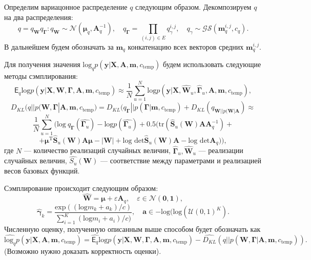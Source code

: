 \documentclass[12pt]{article}
\begin{document}
Определим вариацонное распределение $q$ следующим образом. 
Декомпозируем $q$ на два распределения: 
$$q = q_{\mathbf{W}}q_{\boldsymbol{\Gamma}}:
q_{\mathbf{W}} \sim \mathcal{N}(\boldsymbol{\mu}_q, \mathbf{A}^{-1}_q), \quad q_{\boldsymbol{\Gamma}} = \prod_{(i,j) \in E} q_\gamma^{i,j}, \quad q_\gamma \sim \mathcal{GS}( \mathbf{m}_q^{i,j}, c_q).$$
В дальнейшем будем обозначать за $\mathbf{m}_q$ конкатенацию всех векторов средних  $\mathbf{m}_q^{i,j}$.

Для получения значения $\text{log}_q {p}(\mathbf{y}|\mathbf{X},\mathbf{A},\mathbf{m}, c_{\text{temp}})$ будем использовать следующие методы сэмплирования:
$$
    \mathsf{E}_{q}\text{log} p(\mathbf{y}|\mathbf{X},\mathbf{W}, \boldsymbol{\Gamma}, \mathbf{A},\mathbf{m}, c_{\text{temp}}) \approx \frac{1}{N}\sum_{u =1}^{N} \text{log} p(\mathbf{y}|\mathbf{X},\hat{\mathbf{W}}_u, \hat{\boldsymbol{\Gamma}}_u, \mathbf{A},\mathbf{m}, c_{\text{temp}}),
$$
$$
   {D_{KL}}(q||p(\mathbf{W}, \boldsymbol{\Gamma}| \mathbf{A},\mathbf{m}, c_{\text{temp}}) = {D_{KL}}(q_{\boldsymbol{\Gamma}}||p(\boldsymbol{\Gamma}| \mathbf{m}, c_{\text{temp}}) + {D_{KL}}(q_{\mathbf{W}||p(\mathbf{W}|\mathbf{A}}) \approx
$$
$$
    \frac{1}{N}\sum_{u=1}^N (\text{log}~q_{\boldsymbol{\Gamma}}(\hat{\boldsymbol{\Gamma}_u}) - \text{log}p(\hat{\boldsymbol{\Gamma}_u}) + 0.5(\text{tr}(\hat{\mathbf{S}}_u(\mathbf{W})\mathbf{A}\mathbf{A}_q^{-1}) + $$
$$+\boldsymbol{\mu}^{\text{T}}\hat{\mathbf{S}}_u(\mathbf{W})\mathbf{A}\boldsymbol{\mu} - |\mathbf{W}| + \text{log det}\hat{\mathbf{S}}_u(\mathbf{W})\mathbf{A} -  \text{log det}\mathbf{A}_q )),
$$
где $N$ --- количество реализаций случайных величин, $\hat{\boldsymbol{\Gamma}}_u, \hat{\mathbf{W}}_u$ --- реализации случайных величин, $\hat{S_u}(\mathbf{W})$ --- соответствие между параметрами и реализацией весов базовых функций.

Сэмплирование происходит следующим образом:
$$
    \hat{\mathbf{W}} = \boldsymbol{\mu} + \varepsilon\mathbf{A}_q, \quad \varepsilon \in \mathcal{N}(\mathbf{0}, \mathbf{1}),
$$
$$
    \hat{\boldsymbol{\gamma}}_k = \frac{\text{exp}((\text{log}{m}_k + a_k) / c )}{\sum_{i=1}^K (\text{log}{m}_i + a_i) / c )}, \quad \mathbf{a} \in -\text{log}(\text{log}(\mathcal{U}(0, 1)^K).
$$
Численную оценку, полученную описанным выше способом будет обозначать как 
$$\hat{\text{log}_q} {p}(\mathbf{y}|\mathbf{X},\mathbf{A},\mathbf{m}, c_{\text{temp}}) = \hat{\mathsf{E}_{q}}\text{log} p(\mathbf{y}|\mathbf{X},\mathbf{W}, \boldsymbol{\Gamma}, \mathbf{A},\mathbf{m}, c_{\text{temp}}) - \hat{D_{KL}}(q||p(\mathbf{W}, \boldsymbol{\Gamma}| \mathbf{A},\mathbf{m}, c_{\text{temp}})).$$
(Возможно нужно доказать корректность оценки).
\end{document}
